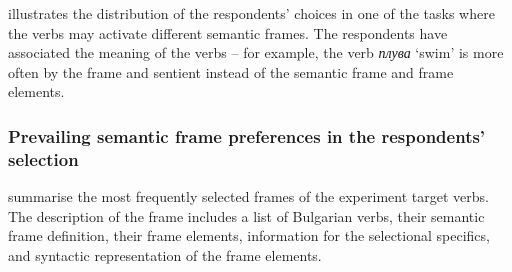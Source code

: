\documentclass[output=paper,colorlinks,citecolor=brown]{langscibook}
\begin{document}
 illustrates the distribution of the respondents' choices in one of the tasks where the verbs may activate different semantic frames. The respondents have associated the meaning of the verbs  -- for example, the verb \textit{плува} `swim' is  more often by the frame  and sentient  instead of  the semantic frame  and  frame elements.

\subsubsection{Prevailing semantic frame preferences in the respondents' selection}\label{subsect:4.2.1}

 summarise the most frequently selected  frames of the experiment  target verbs. The description of the frame includes a list of Bulgarian verbs, their semantic frame definition, their frame elements, information for the selectional specifics, and syntactic representation of the frame elements. 
\newpage
\end{document}
